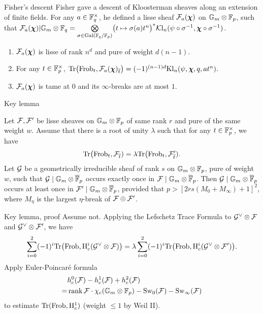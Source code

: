 \documentclass[aspectratio=169,handout]{beamer}
\newcommand\bchi{{\boldsymbol\chi}}
\begin{document}
\begin{frame}{Fisher's descent}
Fisher gave a descent of Kloosterman sheaves along an extension of finite fields.
For any $a\in{\mathbb{F}}_q^\times$, he defined a lisse sheaf $\CF_a(\bchi)$ on $\mathbb{G}_m\otimes{\mathbb{F}}_p$, such that
$\CF_a(\bchi)|\Gm\otimes\BF_q=\bigotimes\limits_{\sigma\in\Gal(\BF_q/\BF_p)} \bigl(t\mapsto \sigma(a)t^n\bigr)^*\CKl_n(\psi\circ\sigma^{-1},\bchi\circ\sigma^{-1})$.
\begin{enumerate}
\item $\CF_a(\bchi)$ is lisse of rank $n^d$ and pure of weight $d(n-1)$.
\item For any $t\in{\mathbb{F}}_p^\times$,
	$\Tr\bigl(\Frob_t,\CF_a(\bchi)_{\ov t}\bigr)=(-1)^{(n-1)d}\Kl_n(\psi,\bchi,q,at^n).$
\item $\CF_a(\bchi)$ is tame at $0$ and its $\infty$-breaks are at most $1$.
\end{enumerate}

\end{frame}


\begin{frame}{Key lemma}
\begin{lemma}
Let ${\mathcal{F}},{\mathcal{F}}'$ be lisse sheaves on $\mathbb{G}_m\otimes{\mathbb{F}}_p$ of same rank $r$ and pure of the same weight $w$.
Assume that there is a root of unity $\lambda$ such that for any $t\in {\mathbb{F}}_p^\times$, we have 
	\[{\mathrm{Tr}}\bigl({\mathrm{Frob}}_t, {\mathcal{F}}_{\overline t})=\lambda{\mathrm{Tr}}\bigl({\mathrm{Frob}}_t, {\mathcal{F}}'_{\overline t}).\]
Let ${\mathcal{G}}$ be a geometrically irreducible sheaf of rank $s$ on $\mathbb{G}_m\otimes{\mathbb{F}}_p$, pure of weight $w$, such that ${\mathcal{G}}\mid \mathbb{G}_m\otimes\overline{{\mathbb{F}}}_p$ occurs exactly once in ${\mathcal{F}}\mid \mathbb{G}_m\otimes\overline {{\mathbb{F}}}_p$.
Then ${\mathcal{G}}\mid \mathbb{G}_m\otimes\overline {{\mathbb{F}}}_p$ occurs at least once in ${\mathcal{F}}'\mid \mathbb{G}_m\otimes\overline {{\mathbb{F}}}_p$, provided that $p>[2rs(M_0+M_\infty)+1]^2$, where $M_\eta$ is the largest $\eta$-break of ${\mathcal{F}}\oplus {\mathcal{F}}'$.
\end{lemma}

\end{frame}


\begin{frame}{Key lemma, proof}
Assume not. 
Applying the Lefschetz Trace Formula to ${\mathcal{G}}^\vee\otimes{\mathcal{F}}$ and ${\mathcal{G}}^\vee\otimes {\mathcal{F}}'$, we have
	\[\sum_{i=0}^2(-1)^i{\mathrm{Tr}}\bigl({\mathrm{Frob}},{\mathrm{H}}_c^i({\mathcal{G}}^\vee\otimes{\mathcal{F}})\bigr)
		=\lambda\sum_{i=0}^2(-1)^i{\mathrm{Tr}}\bigl({\mathrm{Frob}}, {\mathrm{H}}_c^i({\mathcal{G}}^\vee\otimes{\mathcal{F}}')\bigr).\] \pause
Apply  Euler-Poincar\'e formula
	\[\begin{split}
	&h^0_c({\mathcal{F}})-h^1_c({\mathcal{F}})+h^2_c({\mathcal{F}})\\
	=&\operatorname{rank} {\mathcal{F}}\cdot \chi_c(\mathbb{G}_m\otimes{\mathbb{F}}_p)-{\mathrm{Sw}}_0({\mathcal{F}})-{\mathrm{Sw}}_\infty({\mathcal{F}})\end{split}\]
to estimate ${\mathrm{Tr}}({\mathrm{Frob}},{\mathrm{H}}^1_c)$ (weight $\le1$ by Weil II).

\end{frame}
\end{document}

